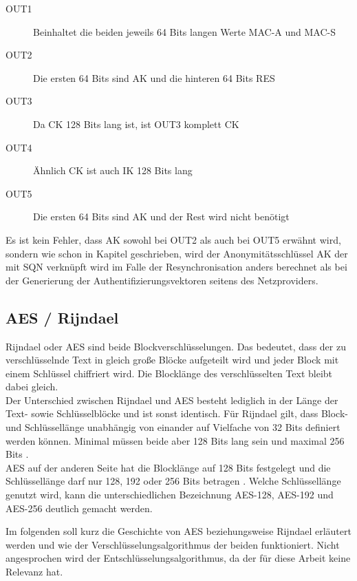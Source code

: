  \begin{description}
  \item [OUT1] Beinhaltet die beiden jeweils 64 Bits langen Werte MAC-A und MAC-S
  \item [OUT2] Die ersten 64 Bits sind AK und die hinteren 64 Bits RES
  \item [OUT3] Da CK 128 Bits lang ist, ist OUT3 komplett CK
  \item [OUT4] Ähnlich CK ist auch IK 128 Bits lang
  \item [OUT5] Die ersten 64 Bits sind AK und der Rest wird nicht benötigt
 \end{description}
 
 Es ist kein Fehler, dass AK sowohl bei OUT2 als auch bei OUT5 erwähnt wird, sondern
 wie schon in Kapitel  geschrieben, wird
 der Anonymitätsschlüssel AK der mit SQN verknüpft wird im Falle der Resynchronisation
 anders berechnet als bei der Generierung der Authentifizierungsvektoren seitens des
 Netzproviders.
 
\subsection{AES / Rijndael}
\label{aes}
 Rijndael oder \ac{AES} sind beide Blockverschlüsselungen. Das bedeutet, dass der zu
 verschlüsselnde Text in gleich große Blöcke aufgeteilt wird und jeder Block mit einem Schlüssel
 chiffriert wird. Die Blocklänge des verschlüsselten Text bleibt dabei gleich. \\
 Der Unterschied zwischen Rijndael und AES besteht lediglich in der Länge der Text- sowie
 Schlüsselblöcke und ist sonst identisch. Für Rijndael gilt, dass Block- und Schlüssellänge
 unabhängig von einander auf Vielfache von 32 Bits definiert werden können. Minimal müssen
 beide aber 128 Bits lang sein und maximal 256 Bits \cite{daemon02}. \\ %
 AES auf der anderen Seite hat die Blocklänge auf 128 Bits festgelegt und die Schlüssel\-länge
 darf nur 128, 192 oder 256 Bits betragen \cite{AES-FIPS}. Welche Schlüssel\-länge genutzt
 wird, kann die unterschiedlichen Bezeichnung AES-128, AES-192 und AES-256 deutlich gemacht
 werden.
 
 Im folgenden soll kurz die Geschichte von AES beziehungsweise Rijndael erläutert werden und
 wie der Verschlüsselungs\-algorithmus der beiden funktioniert. Nicht angesprochen wird der
 Entschlüsselungs\-algorithmus, da der für diese Arbeit keine Relevanz hat.
 
